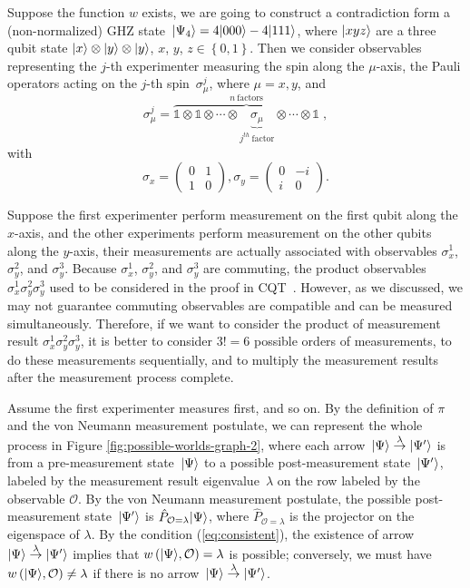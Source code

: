 \documentclass[english,12pt]{iopart}
\makeatletter
\theoremstyle{plain}
\newenvironment{proof}[1][\protect\proofname]{\par
\normalfont\topsep6\p@\@plus6\p@\relax
\trivlist
\itemindent\parindent
\item[\hskip\labelsep\scshape #1]\ignorespaces
}{%
\endtrivlist\@endpefalse
}
\providecommand{\proofname}{Proof}
\newcommand{\dpr}{{\pi}}
\makeatother
\begin{document}
\begin{proof}Suppose the function $w$ exists, we are going to construct
a contradiction form a (non-normalized) GHZ state~${\left\vert{\Psi_{4}}\right\rangle}=4{\left\vert{000}\right\rangle}-4{\left\vert{111}\right\rangle}$,
where ${\left\vert{xyz}\right\rangle}$ are a three qubit state ${\left\vert{x}\right\rangle}\otimes{\left\vert{y}\right\rangle}\otimes{\left\vert{y}\right\rangle}$,
$x$, $y$, $z\in\left\{ 0,1\right\} $. Then we consider observables
representing the $j$-th experimenter measuring the spin along the
$\mu$-axis, the Pauli operators acting on the $j$-th spin~$\sigma_{\mu}^{j}$,
where $\mu=x,y$, and 
\begin{equation}
\sigma_{\mu}^{j}=\overbrace{\mathds{1}\otimes\mathds{1}\otimes\cdots\otimes\underbrace{\sigma_{\mu}}_{j^{th}\ \mbox{factor}}\otimes\cdots\otimes\mathds{1}}^{n\ \mbox{factors}}\;,\label{pauli3}
\end{equation}
with 
\[
\sigma_{x}=\left(\begin{array}{cc}
0 & 1\\
1 & 0
\end{array}\right),\sigma_{y}=\left(\begin{array}{cc}
0 & -i\\
i & 0
\end{array}\right).
\]

Suppose the first experimenter perform measurement on the first qubit
along the $x$-axis, and the other experiments perform measurement on
the other qubits along the $y$-axis, their measurements are actually
associated with observables $\sigma_{x}^{1}$, $\sigma_{y}^{2}$, and
$\sigma_{y}^{3}$. Because $\sigma_{x}^{1}$, $\sigma_{y}^{2}$, and
$\sigma_{y}^{3}$ are commuting, the product
observables~$\sigma_{x}^{1}\sigma_{y}^{2}\sigma_{y}^{3}$ used to be
considered in the proof in CQT~\cite{MerminPRL1990,peres1995quantum}.
However, as we discussed, we may not guarantee commuting observables
are compatible and can be measured simultaneously. Therefore, if we
want to consider the product of measurement result
$\sigma_{x}^{1}\sigma_{y}^{2}\sigma_{y}^{3}$, it is better to consider
$3!=6$ possible orders of measurements, to do these measurements
sequentially, and to multiply the measurement results after the
measurement process complete.

Assume the first experimenter measures first, and so on. By the
definition of $\dpr $ and the von Neumann measurement postulate, we
can represent the whole process in Figure
\ref{fig:possible-worlds-graph-2}, where each
arrow~$\ket{\Psi}\overset{\lambda}{\rightarrow}\ket{\Psi'}$ is from a
pre-measurement state~${\left\vert{\Psi}\right\rangle}$ to a possible post-measurement
state~${\left\vert{\Psi'}\right\rangle}$, labeled by the measurement result
eigenvalue~$\lambda$ on the row labeled by the observable
$\mathcal{O}$. By the von Neumann measurement postulate, the possible
post-measurement state~${\left\vert{\Psi'}\right\rangle}$ is
$\hat{P}_{\mathcal{O}=\lambda}{\left\vert{\Psi}\right\rangle}$, where
$\hat{P}_{\mathcal{O}=\lambda}$ is the projector on the eigenspace of
$\lambda$. By the condition (\ref{eq:consistent}), the existence of
arrow~$\ket{\Psi}\overset{\lambda}{\rightarrow}\ket{\Psi'}$ implies
that $w\left({\left\vert{\Psi}\right\rangle},\mathcal{O}\right)=\lambda$ is possible;
conversely, we must have
$w\left({\left\vert{\Psi}\right\rangle},\mathcal{O}\right)\ne\lambda$ if there is no
arrow~$\ket{\Psi}\overset{\lambda}{\rightarrow}\ket{\Psi'}$.


\end{proof}
\end{document}

